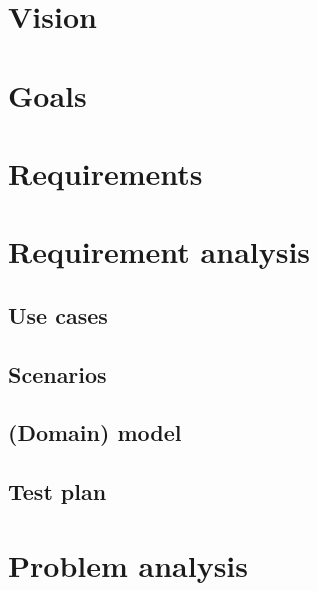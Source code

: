 \section{Vision}

\section{Goals}

\section{Requirements}

 
\section{Requirement analysis}
\subsection{Use cases}

\subsection{Scenarios}

\subsection{(Domain) model}

\subsection{Test plan}

\section{Problem analysis}
